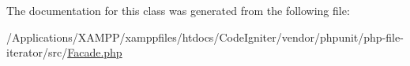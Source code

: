 The documentation for this class was generated from the following file\+:\begin{DoxyCompactItemize}
\item 
/\+Applications/\+X\+A\+M\+P\+P/xamppfiles/htdocs/\+Code\+Igniter/vendor/phpunit/php-\/file-\/iterator/src/\mbox{\hyperlink{php-file-iterator_2src_2_facade_8php}{Facade.\+php}}\end{DoxyCompactItemize}
